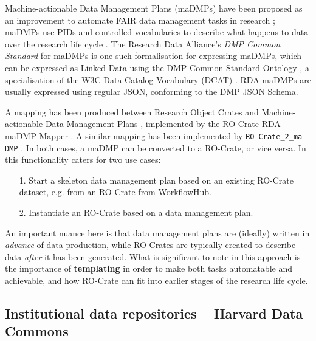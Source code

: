 \documentclass[ds,v1.1.2,openaccess]{iosart2x}%
\begin{document}
Machine-actionable Data Management Plans (maDMPs) have been proposed as
an improvement to automate FAIR data management tasks in research
\cite{doi:10.1371/journal.pcbi.1006750}; maDMPs use PIDs and controlled
vocabularies to describe what happens to data over the research life
cycle \cite{doi:10.1007/978-3-030-45442-5_15}. The Research Data Alliance's
\textit{DMP Common Standard} for maDMPs \cite{doi:10.15497/rda00039} is one such
formalisation for expressing maDMPs, which can be expressed as Linked
Data using the DMP Common Standard Ontology
\cite{doi:10.4126/frl01-006423289}, a specialisation of the W3C Data
Catalog Vocabulary (DCAT) \cite{dcat2}. RDA maDMPs are usually expressed
using regular JSON, conforming to the DMP JSON Schema.

A mapping has been produced between Research Object Crates and
Machine-actionable Data Management Plans
\cite{doi:10.4126/frl01-006423291}, implemented by the RO-Crate RDA maDMP
Mapper \cite{doi:10.5281/zenodo.3922136}. A similar mapping has been
implemented by \texttt{RO-Crate\_2\_ma-DMP} \cite{doi:10.5281/zenodo.3903463}. In
both cases, a maDMP can be converted to a RO-Crate, or vice versa. In
\cite{doi:10.4126/frl01-006423291} this functionality caters for two use cases:
\begin{enumerate}
\item[1.] Start a skeleton data management plan based on an existing RO-Crate
dataset, e.g. from an RO-Crate from WorkflowHub.
\item[2.] Instantiate an RO-Crate based on a data management plan.
\end{enumerate}

An important nuance here is that data management plans are (ideally)
written in \textit{advance} of data production, while RO-Crates are typically
created to describe data \textit{after} it has been generated. What is
significant to note in this approach is the importance of
\textbf{templating} in order to make both tasks automatable and achievable,
and how RO-Crate can fit into earlier stages of the research life cycle.
\subsection{Institutional data repositories -- Harvard Data Commons}%

\label{sec:institutionalrepos}
\end{document}
